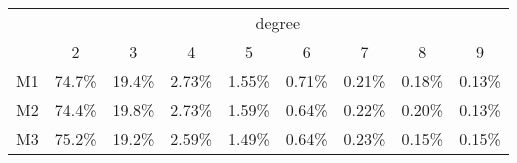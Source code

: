 \begin{tabular}{ l | c | c | c | c | c | c | c | c}
& \multicolumn{8}{c}{degree}\\
& 2 & 3 & 4 & 5 & 6 & 7 & 8 & 9\\
M1 & 74.7\% & 19.4\% & 2.73\% & 1.55\% & 0.71\% & 0.21\% & 0.18\% & 0.13\%\\
M2 & 74.4\% & 19.8\% & 2.73\% & 1.59\% & 0.64\% & 0.22\% & 0.20\% & 0.13\%\\
M3 & 75.2\% & 19.2\% & 2.59\% & 1.49\% & 0.64\% & 0.23\% & 0.15\% & 0.15\%\\
\end{tabular}
